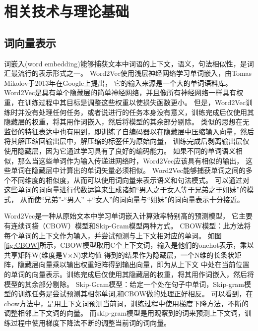\chapter{相关技术与理论基础}

\section{词向量表示}

词嵌入(word embedding)能够捕获文本中词语的上下文，语义，句法相似性，是词汇最流行的表示形式之一。
Word2Vec使用浅层神经网络学习单词嵌入，由Tomas Mikolov于2013年在Google上提出\cite{mikolov2013distributed}，
它的输入来源是一个大的单词语料库。
Word2Vec是具有单个隐藏层的简单神经网络，并且像所有神经网络一样具有权重，在训练过程中其目标是调整这些权重以使损失函数更小\cite{goldberg2014word2vec}。 
但是，Word2Vec训练时并没有处理任何任务，或者说进行的任务本身没有意义，训练完成后仅使用其隐藏层的权重，将其用作词嵌入，然后将模型的其余部分剔除。
类似的思想在无监督的特征表达中也有用到，即训练了自编码器以在隐藏层中压缩输入向量，然后将其解压缩回输出层中，解压缩的标签任为原始向量，
训练完成后剥离输出层仅使用隐藏层，因为它通过学习具有了良好的编码能力。
如果不同的单词语义相似，那么当这些单词作为输入传递进网络时，Word2Vec应该具有相似的输出，
这些单词在隐藏层中计算出的单词矢量必须相似。
Word2Vec能够捕获单词之间的多个不同维度的相似度，从而可以使用词向量来表示语义和句法模式。
可以通过对这些单词的词向量进行代数运算来生成诸如“男人之于女人等于兄弟之于姐妹”的模式，
从而使“兄弟”-“男人” +“女人”的词向量与“姐妹”的词向量表示十分接近。

Word2Vec是一种从原始文本中学习单词嵌入计算效率特别高的预测模型，
它主要有连续词袋（CBOW）模型和Skip-Gram模型两种方式。
CBOW模型：此方法将每个单词的上下文作为输入，并尝试预测与上下文相对应的单词。
如图\ref{fig:CBOW}所示，CBOW模型取用C个上下文词，输入是他们的onehot表示，乘以共享矩阵W(维度是V×N)求均值
得到的结果作为隐藏层，一个N维的长条状矩阵，隐藏层向量乘以输出权重矩阵得到输出向量，即为从上下文
中处在当前位置的单词的向量表示。训练完成后仅使用其隐藏层的权重，将其用作词嵌入，然后将模型的其余部分剔除。
Skip-Gram模型：给定一个处在句子中单词，Skip-gram模型的训练任务是尝试预测其相邻单词,和CBOW做的处理正好相反。
可以看到，在cbow方法中，是用上下文词预测当前词，训练过程中使用梯度下降方法，不断的调整相邻上下文词的向量。
而skip-gram模型是用观察到的词来预测上下文词，训练过程中使用梯度下降法不断的调整当前词的词向量。

